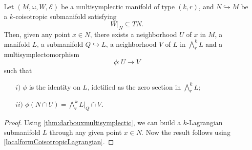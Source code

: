 \begin{theorem}\label{localformcoisotropic} Let $(M, \omega, W, \mathcal{E})$ be a multisymplectic manifold of type $(k,r)$, and $N \hookrightarrow M$ be a $k$-coisotropic submanifold satisfying $$W|_N \subseteq TN.$$ Then, given any point $x \in N$, there exists a neighborhood $U$ of $x$ in $M$, a manifold $L$, a submanifold $Q \hookrightarrow L$, a neighborhood $V$ of $L$ in $\bigwedge^k_r L$ and a multisymplectomorphism $$\phi: U \rightarrow V$$ such that
\begin{itemize}
    \item[$i)$] $\phi$ is the identity on $L$, idetified as the zero section in $\bigwedge^k_r L$;
    \item[$ii)$] $\phi(N \cap U) = \bigwedge^k_r L \big |_Q \cap V.$
\end{itemize}
\end{theorem}
\begin{proof} Using \cref{thm:darbouxmultisymplectic}, we can build a $k$-Lagrangian submanifold $L$ through any given point $x \in N.$ Now the result follows using \cref{localformCoisotropicLagrangian}.
\end{proof}